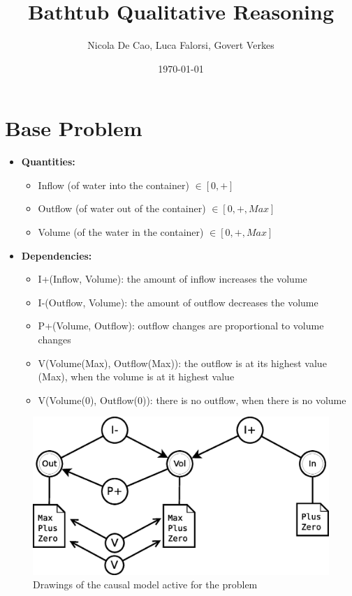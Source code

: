 \documentclass[a4paper]{article}
\title{Bathtub Qualitative Reasoning}
\author{Nicola De Cao, Luca Falorsi, Govert Verkes}
\date{\today}
\begin{document}
\maketitle

\section{Base Problem}

\begin{itemize}
\item \textbf{Quantities:}
\begin{itemize}
\item Inflow (of water into the container) $\in [0, +]$
\item Outflow (of water out of the container) $\in [0, +, Max]$
\item Volume (of the water in the container) $\in [0, +, Max]$
\end{itemize}

\item \textbf{Dependencies:}

\begin{itemize}
\item I+(Inflow, Volume): the amount of inflow increases the volume
\item I-(Outflow, Volume): the amount of outflow decreases the volume
\item P+(Volume, Outflow): outflow changes are proportional to volume changes
\item V(Volume(Max), Outflow(Max)): the outflow is at its highest value (Max), when the volume is at it highest value
\item V(Volume(0), Outflow(0)): there is no outflow, when there is no volume
\end{itemize}
\end{itemize}


\begin{figure}[H]
\centering
\includegraphics[scale=0.5]{problem1.eps}
\caption{Drawings of the causal model active for the problem}
\end{figure}
\end{document}
